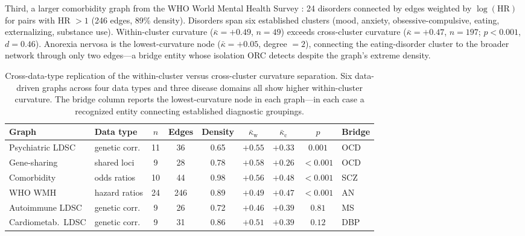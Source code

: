 \documentclass{article}
\begin{document}
Third, a larger comorbidity graph from the WHO World Mental Health Survey \citep{mcgrath2020comorbidity}: 24 disorders connected by edges weighted by $\log(\text{HR})$ for pairs with HR $> 1$ (246 edges, 89\% density). Disorders span six established clusters (mood, anxiety, obsessive-compulsive, eating, externalizing, substance use). Within-cluster curvature ($\bar{\kappa} = +0.49$, $n = 49$) exceeds cross-cluster curvature ($\bar{\kappa} = +0.47$, $n = 197$; $p < 0.001$, $d = 0.46$). Anorexia nervosa is the lowest-curvature node ($\bar{\kappa} = +0.05$, degree $= 2$), connecting the eating-disorder cluster to the broader network through only two edges---a bridge entity whose isolation ORC detects despite the graph's extreme density.

\begin{table}[t]
\centering
\caption{Cross-data-type replication of the within-cluster versus cross-cluster curvature separation. Six data-driven graphs across four data types and three disease domains all show higher within-cluster curvature. The bridge column reports the lowest-curvature node in each graph---in each case a recognized entity connecting established diagnostic groupings.}
\label{tab:crossdomain}
\begin{tabular}{llccccccl}
\toprule
Graph & Data type & $n$ & Edges & Density & $\bar{\kappa}_{\text{w}}$ & $\bar{\kappa}_{\text{c}}$ & $p$ & Bridge \\
\midrule
Psychiatric LDSC & genetic corr. & 11 & 36 & 0.65 & $+0.55$ & $+0.33$ & $\mathbf{0.001}$ & OCD \\
Gene-sharing & shared loci & 9 & 28 & 0.78 & $+0.58$ & $+0.26$ & $\mathbf{<0.001}$ & OCD \\
Comorbidity & odds ratios & 10 & 44 & 0.98 & $+0.56$ & $+0.48$ & $\mathbf{<0.001}$ & SCZ \\
WHO WMH & hazard ratios & 24 & 246 & 0.89 & $+0.49$ & $+0.47$ & $\mathbf{<0.001}$ & AN \\
Autoimmune LDSC & genetic corr. & 9 & 26 & 0.72 & $+0.46$ & $+0.39$ & $0.81$ & MS \\
Cardiometab.\ LDSC & genetic corr. & 9 & 31 & 0.86 & $+0.51$ & $+0.39$ & $0.12$ & DBP \\
\bottomrule
\end{tabular}
\end{table}
\end{document}
